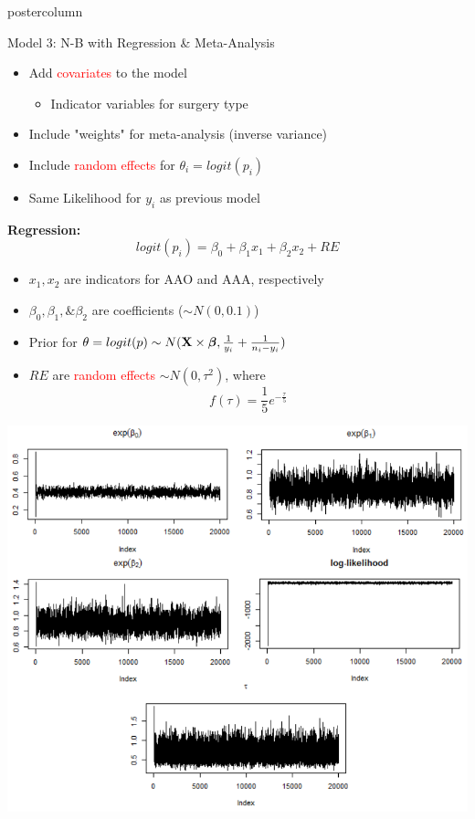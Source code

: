 \documentclass[final]{beamer}\usepackage[]{graphicx}\usepackage[]{color}
\newcommand{\bbeta}{\mbox{\boldmath $\beta$} }
\newcommand{\bfX}{\mbox{\bf X} }
\newcommand{\red}{\textcolor{red}}
\begin{document}
{\begin{frame}
\begin{columns}
\begin{column}{.33\textwidth}
\begin{beamercolorbox}[center,wd=\textwidth]{postercolumn}
\begin{minipage}[T]{.97\textwidth}
{%
\begin{block}{Model 3: N-B with Regression \& Meta-Analysis}
	
\begin{itemize}
	\item Add \red{covariates} to the model
	\begin{itemize}
	  \item Indicator variables for surgery type
	 \end{itemize}
	\item Include "weights" for meta-analysis (inverse variance)
	\item Include \red{random effects} for $\theta_i=logit(p_i)$
	\item Same Likelihood for $y_i$ as previous model
\end{itemize}
	
{\bf Regression:}
$$logit(p_i)=\beta_0+\beta_1x_1+\beta_2x_2+RE$$

\begin{itemize}
  \item $x_1,x_2$ are indicators for AAO and AAA, respectively
  \item $\beta_0,\beta_1,\&\beta_2$ are coefficients ($\sim N(0,0.1)$)
  \item Prior for $\theta=logit(p)\sim N(\bfX \times \bbeta,\frac{1}{y_i}+\frac{1}{n_i-y_i})$
  \item $RE$ are \red{random effects} $\sim N(0,\tau^2)$, where $$f(\tau)=\frac{1}{5}e^{-\frac{\tau}{5}}$$
\end{itemize}
	
	
\centering
\includegraphics[scale=2]{traces.png}\ \	


\end{block}}
\end{minipage}
\end{beamercolorbox}
\end{column}
\end{columns}
\end{frame}}
\end{document}

